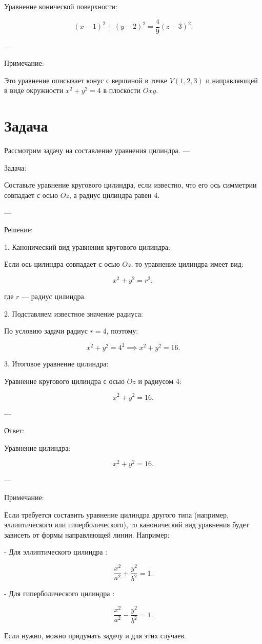 \documentclass[a4paper,14pt]{extreport} %
\begin{document}
Уравнение конической поверхности:

\[
(x - 1)^2 + (y - 2)^2 = \frac{4}{9}(z - 3)^2.
\]

---

 Примечание: 

Это уравнение описывает конус с вершиной в точке \( V(1, 2, 3) \) и направляющей в виде окружности \( x^2 + y^2 = 4 \) в плоскости \( Oxy \).


\section*{Задача}
Рассмотрим задачу на составление уравнения цилиндра.
---

 Задача: 

Составьте уравнение кругового цилиндра, если известно, что его ось симметрии совпадает с осью \( Oz \), а радиус цилиндра равен 4.

---

 Решение: 

1.  Канонический вид уравнения кругового цилиндра: 

   Если ось цилиндра совпадает с осью \( Oz \), то уравнение цилиндра имеет вид:

   \[
   x^2 + y^2 = r^2,
   \]

   где \( r \) — радиус цилиндра.

2.  Подставляем известное значение радиуса: 

   По условию задачи радиус \( r = 4 \), поэтому:

   \[
   x^2 + y^2 = 4^2 \implies x^2 + y^2 = 16.
   \]

3.  Итоговое уравнение цилиндра: 

   Уравнение кругового цилиндра с осью \( Oz \) и радиусом 4:

   \[
   x^2 + y^2 = 16.
   \]

---

 Ответ: 

Уравнение цилиндра:

\[
x^2 + y^2 = 16.
\]

---

 Примечание: 

Если требуется составить уравнение цилиндра другого типа (например, эллиптического или гиперболического), то канонический вид уравнения будет зависеть от формы направляющей линии. Например:

- Для  эллиптического цилиндра :

  \[
  \frac{x^2}{a^2} + \frac{y^2}{b^2} = 1.
  \]

- Для  гиперболического цилиндра :

  \[
  \frac{x^2}{a^2} - \frac{y^2}{b^2} = 1.
  \]

Если нужно, можно придумать задачу и для этих случаев.
%
%
%
\end{document}
